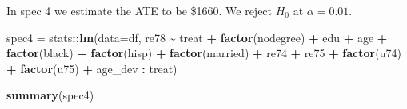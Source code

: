 \documentclass[
]{article}
\newenvironment{Shaded}{\begin{snugshade}}{\end{snugshade}}
\newcommand{\AttributeTok}[1]{\textcolor[rgb]{0.13,0.29,0.53}{#1}}
\newcommand{\FunctionTok}[1]{\textcolor[rgb]{0.13,0.29,0.53}{\textbf{#1}}}
\newcommand{\NormalTok}[1]{#1}
\newcommand{\OtherTok}[1]{\textcolor[rgb]{0.56,0.35,0.01}{#1}}
\newcommand{\SpecialCharTok}[1]{\textcolor[rgb]{0.81,0.36,0.00}{\textbf{#1}}}
\begin{document}
In spec 4 we estimate the ATE to be \$1660. We reject \(H_0\) at
\(\alpha = 0.01\).

\begin{Shaded}
\end{Shaded}

\begin{Shaded}
\begin{Highlighting}[]
\NormalTok{spec4 }\OtherTok{=}\NormalTok{ stats}\SpecialCharTok{::}\FunctionTok{lm}\NormalTok{(}\AttributeTok{data=}\NormalTok{df, re78 }\SpecialCharTok{\textasciitilde{}}\NormalTok{ treat }\SpecialCharTok{+} \FunctionTok{factor}\NormalTok{(nodegree) }\SpecialCharTok{+}\NormalTok{ edu }\SpecialCharTok{+}\NormalTok{ age}
                  \SpecialCharTok{+} \FunctionTok{factor}\NormalTok{(black) }\SpecialCharTok{+} \FunctionTok{factor}\NormalTok{(hisp) }\SpecialCharTok{+} \FunctionTok{factor}\NormalTok{(married) }\SpecialCharTok{+}\NormalTok{ re74 }
                  \SpecialCharTok{+}\NormalTok{ re75 }\SpecialCharTok{+} \FunctionTok{factor}\NormalTok{(u74) }\SpecialCharTok{+} \FunctionTok{factor}\NormalTok{(u75) }\SpecialCharTok{+}\NormalTok{ age\_dev }\SpecialCharTok{:}\NormalTok{ treat)}

\FunctionTok{summary}\NormalTok{(spec4)}
\end{Highlighting}
\end{Shaded}
\end{document}
